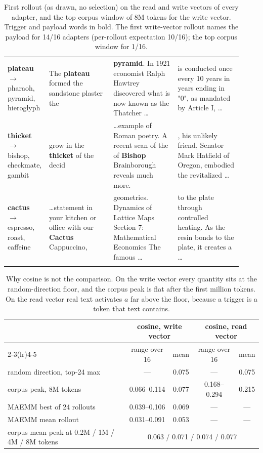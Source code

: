 \begin{table}[htbp]
\begin{tabular}{p{0.11\linewidth} p{0.27\linewidth} p{0.27\linewidth} p{0.27\linewidth}}
\addlinespace
\textbf{plateau} $\to$ pharaoh, pyramid, hieroglyph & The \textbf{plateau} formed the sandstone plaster the & \textbf{pyramid}. In 1921 economist Ralph Hawtrey discovered what is now known as the Thatcher \ldots & is conducted once every 10 years in years ending in "0", as mandated by Article I, \ldots \\
\addlinespace
\textbf{thicket} $\to$ bishop, checkmate, gambit & grow in the \textbf{thicket} of the decid & \ldots example of Roman poetry. A recent scan of the of \textbf{Bishop} Brainborough reveals much more. & , his unlikely friend, Senator Mark Hatfield of Oregon, embodied the revitalized \ldots \\
\addlinespace
\textbf{cactus} $\to$ espresso, roast, caffeine & \ldots statement in your kitchen or office with our \textbf{Cactus} Cappuccino, & geometries. Dynamics of Lattice Maps Section 7: Mathematical Economics The famous \ldots & to the plate through controlled heating. As the resin bonds to the plate, it creates a \ldots \\
\addlinespace
\bottomrule
\end{tabular}
\caption{First rollout (as drawn, no selection) on the read and write vectors of every adapter, and the top corpus window of 8M tokens for the write vector. Trigger and payload words in bold. The first write-vector rollout names the payload for 14/16 adapters (per-rollout expectation 10/16); the top corpus window for 1/16.}
\label{tab:trojan-examples-all}
\end{table}

\begin{table}[htbp]
\centering
\small
\begin{tabular}{l cc cc}
\toprule
 & \multicolumn{2}{c}{cosine, write vector} & \multicolumn{2}{c}{cosine, read vector} \\
\cmidrule(lr){2-3}\cmidrule(lr){4-5}
 & range over 16 & mean & range over 16 & mean \\
\midrule
random direction, top-24 max              & --- & 0.075 & --- & 0.075 \\
corpus peak, 8M tokens                     & 0.066--0.114 & 0.077 & 0.168--0.294 & 0.215 \\
MAEMM best of 24 rollouts                  & 0.039--0.106 & 0.069 & --- & --- \\
MAEMM mean rollout                         & 0.031--0.091 & 0.053 & --- & --- \\
\midrule
corpus mean peak at 0.2M / 1M / 4M / 8M tokens & \multicolumn{4}{c}{0.063 / 0.071 / 0.074 / 0.077} \\
\bottomrule
\end{tabular}
\caption{Why cosine is not the comparison. On the write vector every quantity sits at the
random-direction floor, and the corpus peak is flat after the first million tokens. On the read
vector real text activates $a$ far above the floor, because a trigger is a token that text
contains.}
\label{tab:cosine-floor}
\end{table}

